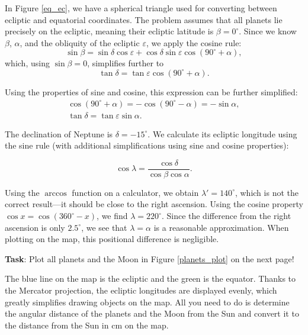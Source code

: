 \documentclass[a4paper,12pt]{extarticle}
\begin{document}
\begin{sol}
In Figure \ref{eq_ec}, we have a spherical triangle used for converting between ecliptic and equatorial coordinates. The problem assumes that all planets lie precisely on the ecliptic, meaning their ecliptic latitude is \(\beta = 0^\circ\). Since we know \(\beta\), \(\alpha\), and the obliquity of the ecliptic \(\varepsilon\), we apply the cosine rule:
\[
\sin \beta = \sin \delta \cos \varepsilon + \cos \delta \sin \varepsilon \cos(90^\circ + \alpha),
\]
which, using \(\sin \beta = 0\), simplifies further to
\[
\tan \delta = \tan \varepsilon \cos(90^\circ + \alpha).
\]

Using the properties of sine and cosine, this expression can be further simplified:
\begin{gather*}
	\cos(90^\circ + \alpha) = -\cos(90^\circ - \alpha) = -\sin \alpha,\\
	\tan \delta = \tan \varepsilon \sin \alpha.
\end{gather*}

The declination of Neptune is \(\delta = -15^\circ\). We calculate its ecliptic longitude using the sine rule (with additional simplifications using sine and cosine properties):

\[
\cos \lambda = \frac{\cos \delta}{\cos \beta \cos \alpha}.
\]

Using the \(\arccos\) function on a calculator, we obtain \(\lambda' = 140^\circ\), which is not the correct result—it should be close to the right ascension. Using the cosine property \(\cos x = \cos(360^\circ - x)\), we find \(\lambda = 220^\circ\). Since the difference from the right ascension is only \(2.5^\circ\), we see that \(\lambda = \alpha\) is a reasonable approximation. When plotting on the map, this positional difference is negligible.
\end{sol}
\begin{pro}
\textbf{Task}: Plot all planets and the Moon in Figure \ref{planets_plot} on the next page!
\end{pro}
\begin{defi}
	The blue line on the map is the ecliptic and the green is the equator. Thanks to the Mercator projection, the ecliptic longitudes are displayed evenly, which greatly simplifies drawing objects on the map. All you need to do is determine the angular distance of the planets and the Moon from the Sun and convert it to the distance from the Sun in cm on the map.
\end{defi}
\end{document}
